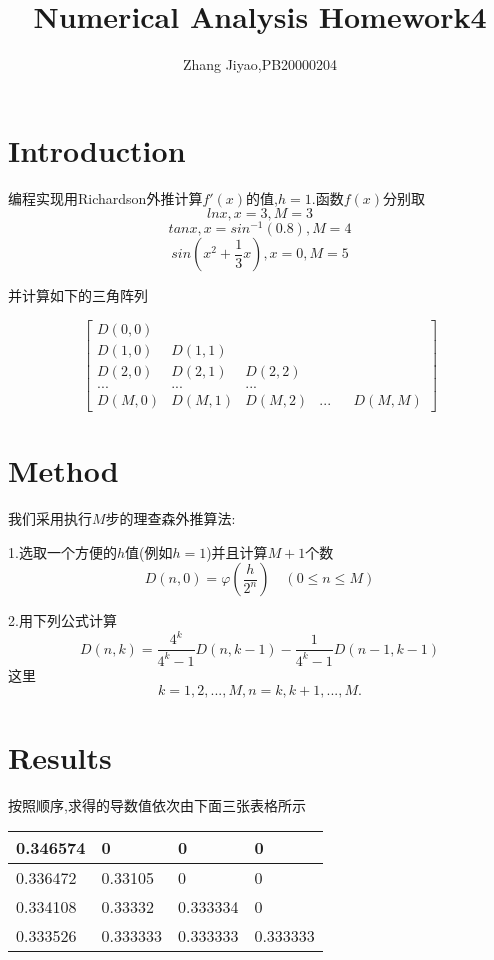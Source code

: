 \documentclass{article}
\title{Numerical Analysis Homework4}
\author{Zhang Jiyao,PB20000204}
\begin{document}
	\maketitle
	
	\section{Introduction}
	
	编程实现用Richardson外推计算$f'(x)$的值,$h=1$.函数$f(x)$分别取
	$$ lnx,x=3,M=3$$
	$$ tanx,x=sin^{-1}(0.8),M=4$$
	$$ sin(x^2+\frac{1}{3}x),x=0,M=5$$
	
	并计算如下的三角阵列
	
\begin{equation}
	\begin{bmatrix}
		D(0,0)  \\
		D(1,0) & D(1,1)  \\
		D(2,0) & D(2,1) & D(2,2) \\
		... & ... & ... \\
		D(M,0) & D(M,1) & D(M,2) &...& & D(M,M)
	\end{bmatrix}
\end{equation}

	
	\section{Method}
	
	我们采用执行$M$步的理查森外推算法:
	
	1.选取一个方便的$h$值(例如$h=1$)并且计算$M+1$个数
	$$ D(n,0)=\varphi(\frac{h}{2^n})  \quad (0 \leq n \leq M)$$
	
	2.用下列公式计算
	$$ D(n,k)=\frac{4^k}{4^k-1}D(n,k-1)-\frac{1}{4^k-1}D(n-1,k-1)  $$
	这里
	$$ k=1,2,...,M, n=k,k+1,...,M.$$
	
	\bigskip
	

	\section{Results}
	
	按照顺序,求得的导数值依次由下面三张表格所示
	
	\begin{table}[H]
		\begin{tabular}{|l|l|l|l|}
			\hline
			0.346574 & 0        & 0        & 0        \\ \hline
			0.336472 & 0.33105  & 0        & 0        \\ \hline
			0.334108 & 0.33332  & 0.333334 & 0        \\ \hline
			0.333526 & 0.333333 & 0.333333 & 0.333333 \\ \hline
		\end{tabular}
	\end{table}
\end{document}
